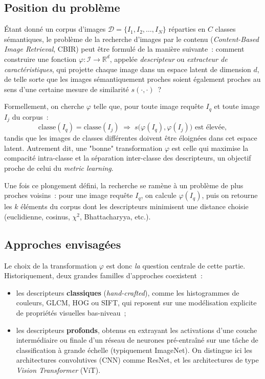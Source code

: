 \documentclass[a4paper,11pt]{article}
\begin{document}
\subsection{Position du problème}

Étant donné un corpus d'images $\mathcal{D} = \{I_1, I_2, \dots, I_N\}$ 
réparties en $C$ classes sémantiques, le problème de la recherche d'images 
par le contenu (\textit{Content-Based Image Retrieval}, CBIR) peut être 
formulé de la manière suivante~: comment construire une fonction 
$\varphi : \mathcal{I} \rightarrow \mathbb{R}^d$, appelée \emph{descripteur} 
ou \emph{extracteur de caractéristiques}, qui projette chaque image dans un 
espace latent de dimension $d$, de telle sorte que les images 
sémantiquement proches soient également proches au sens d'une certaine 
mesure de similarité $s(\cdot, \cdot)$~?

Formellement, on cherche $\varphi$ telle que, pour toute image requête 
$I_q$ et toute image $I_j$ du corpus~:
\begin{equation}
    \text{classe}(I_q) = \text{classe}(I_j) 
    \;\Longrightarrow\; 
    s\bigl(\varphi(I_q), \varphi(I_j)\bigr) \text{ est élevée},
    \label{eq:cbir_objective}
\end{equation}
tandis que les images de classes différentes doivent être éloignées dans 
cet espace latent. Autrement dit, une "bonne" transformation $\varphi$ 
est celle qui maximise la compacité intra-classe et la séparation 
inter-classe des descripteurs, un objectif proche de celui du 
\textit{metric learning}.

Une fois ce plongement défini, la recherche se ramène à un problème de 
plus proches voisins~: pour une image requête $I_q$, on calcule 
$\varphi(I_q)$, puis on retourne les $k$ éléments du corpus dont les 
descripteurs minimisent une distance choisie (euclidienne, cosinus, 
$\chi^2$, Bhattacharyya, etc.).

\subsection{Approches envisagées}

Le choix de la transformation $\varphi$ est donc \emph{la} question 
centrale de cette partie. Historiquement, deux grandes familles 
d'approches coexistent~:

\begin{itemize}
    \item les descripteurs \textbf{classiques} (\textit{hand-crafted}), 
    comme les histogrammes de couleurs, GLCM, HOG ou 
    SIFT, qui reposent sur une modélisation explicite de propriétés 
    visuelles bas-niveau~;
    \item les descripteurs \textbf{profonds}, obtenus en extrayant les 
    activations d'une couche intermédiaire ou finale d'un réseau de 
    neurones pré-entraîné sur une tâche de classification à grande échelle 
    (typiquement ImageNet). On distingue ici les architectures 
    convolutives (CNN) comme ResNet, et les 
    architectures de type \textit{Vision Transformer} 
    (ViT).
\end{itemize}
\end{document}
